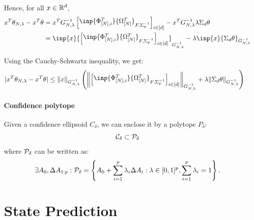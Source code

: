 \documentclass{article}
\begin{document}
Hence, for all $x\in\mathbb{R}^d$,
\begin{align*}
    x^T\theta_{N,\lambda}  -x^T\theta &= x^T G_{N, \lambda}^{-1}\begin{bmatrix}\inp{\Phi_{[N],i}^T}{\Omega_{[N]}^T}_{F, \Sigma_p^{-1}}\end{bmatrix}_{i\in[d]} 
    - x^T G_{N, \lambda}^{-1}\lambda\Sigma_d\theta\\
    &= \inp{x}{\begin{bmatrix}\inp{\Phi_{[N],i}^T}{\Omega_{[N]}^T}_{F, \Sigma_p^{-1}}\end{bmatrix}_{i\in[d]}}_{G_{N, \lambda}^{-1}} - \lambda\inp{x}{\Sigma_d\theta}_{G_{N, \lambda}^{-1}}
\end{align*}

Using the Cauchy-Schwartz inequality, we get:
\begin{align*}
    |x^T\theta_{N,\lambda}  -x^T\theta| &\leq \|x\|_{G_{N, \lambda}^{-1}}\left(\left\|\begin{bmatrix}\inp{\Phi_{[N],i}^T}{\Omega_{[N]}^T}_{F, \Sigma_p^{-1}}\end{bmatrix}_{i\in[d]}\right\|_{G_{N, \lambda}^{-1}} + \lambda\|\Sigma_d\theta\|_{G_{N, \lambda}^{-1}}\right)
\end{align*}

\paragraph{Confidence polytope}

Given a confidence ellipsoid $C_\delta$, we can enclose it by a polytope $P_\delta$:
\[\mathcal{C}_\delta \subset \mathcal{P}_\delta\]
where $\mathcal{P}_\delta$ can be written as:
\begin{equation}
     \exists A_0,\Delta A_{1:p}: \mathcal{P}_\delta = \left\{ A_{0}+\sum_{i=1}^{p}\lambda_{i}\Delta A_{i}: \lambda\in[0, 1]^p,  \sum_{i=1}^{p}\lambda_{i}=1\right\}.
\end{equation}


\section{State Prediction}
\end{document}
